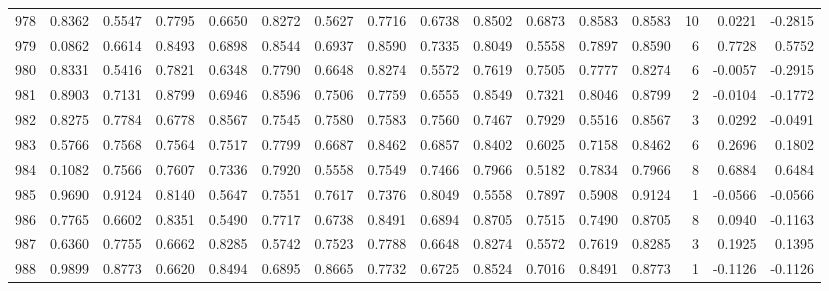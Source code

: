 \begin{tabular}{lrrrrrrrrrrrrrrr}
978 &      0.8362 &  0.5547 &  0.7795 &  0.6650 &  0.8272 &  0.5627 &  0.7716 &  0.6738 &  0.8502 &  0.6873 &   0.8583 &     0.8583 &     10 &                    0.0221 &                    -0.2815 \\
979 &      0.0862 &  0.6614 &  0.8493 &  0.6898 &  0.8544 &  0.6937 &  0.8590 &  0.7335 &  0.8049 &  0.5558 &   0.7897 &     0.8590 &      6 &                    0.7728 &                     0.5752 \\
980 &      0.8331 &  0.5416 &  0.7821 &  0.6348 &  0.7790 &  0.6648 &  0.8274 &  0.5572 &  0.7619 &  0.7505 &   0.7777 &     0.8274 &      6 &                   -0.0057 &                    -0.2915 \\
981 &      0.8903 &  0.7131 &  0.8799 &  0.6946 &  0.8596 &  0.7506 &  0.7759 &  0.6555 &  0.8549 &  0.7321 &   0.8046 &     0.8799 &      2 &                   -0.0104 &                    -0.1772 \\
982 &      0.8275 &  0.7784 &  0.6778 &  0.8567 &  0.7545 &  0.7580 &  0.7583 &  0.7560 &  0.7467 &  0.7929 &   0.5516 &     0.8567 &      3 &                    0.0292 &                    -0.0491 \\
983 &      0.5766 &  0.7568 &  0.7564 &  0.7517 &  0.7799 &  0.6687 &  0.8462 &  0.6857 &  0.8402 &  0.6025 &   0.7158 &     0.8462 &      6 &                    0.2696 &                     0.1802 \\
984 &      0.1082 &  0.7566 &  0.7607 &  0.7336 &  0.7920 &  0.5558 &  0.7549 &  0.7466 &  0.7966 &  0.5182 &   0.7834 &     0.7966 &      8 &                    0.6884 &                     0.6484 \\
985 &      0.9690 &  0.9124 &  0.8140 &  0.5647 &  0.7551 &  0.7617 &  0.7376 &  0.8049 &  0.5558 &  0.7897 &   0.5908 &     0.9124 &      1 &                   -0.0566 &                    -0.0566 \\
986 &      0.7765 &  0.6602 &  0.8351 &  0.5490 &  0.7717 &  0.6738 &  0.8491 &  0.6894 &  0.8705 &  0.7515 &   0.7490 &     0.8705 &      8 &                    0.0940 &                    -0.1163 \\
987 &      0.6360 &  0.7755 &  0.6662 &  0.8285 &  0.5742 &  0.7523 &  0.7788 &  0.6648 &  0.8274 &  0.5572 &   0.7619 &     0.8285 &      3 &                    0.1925 &                     0.1395 \\
988 &      0.9899 &  0.8773 &  0.6620 &  0.8494 &  0.6895 &  0.8665 &  0.7732 &  0.6725 &  0.8524 &  0.7016 &   0.8491 &     0.8773 &      1 &                   -0.1126 &                    -0.1126 \\

\end{tabular}
